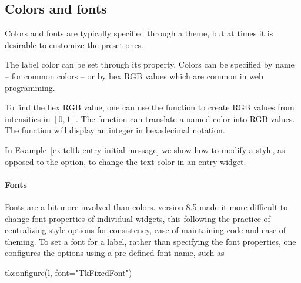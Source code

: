 \subsection{Colors and fonts}
\label{sec:tcltk:overview:colors-fonts}
Colors and fonts are typically specified through a theme, but at times
it is desirable to customize the preset ones.

The label color can be set through its 
property. Colors can be specified by name -- for common colors -- or
by hex RGB values which are common in web programming.
\begin{Schunk}
\end{Schunk}

To find the hex RGB value, one can use the  function to
create RGB values from intensities in $[0,1]$.  The \R\/ function
 can translate a named color into RGB values. The
 function will display an integer in hexadecimal
notation.

In Example~\ref{ex:tcltk-entry-initial-message} we show how to modify
a style, as opposed to the  option, to change the
text color in an entry widget.

\paragraph{Fonts}
Fonts are a bit more involved than colors. \TK\/ version 8.5 made it
more difficult to change font properties of individual widgets, this
following the practice of centralizing style options for consistency,
ease of maintaining code and ease of theming.  To set a font for a
label, rather than specifying the font properties, one configures the
 options using a pre-defined font name, such as
\begin{Schunk}
\begin{Sinput}
 tkconfigure(l, font="TkFixedFont")
\end{Sinput}
\end{Schunk}

